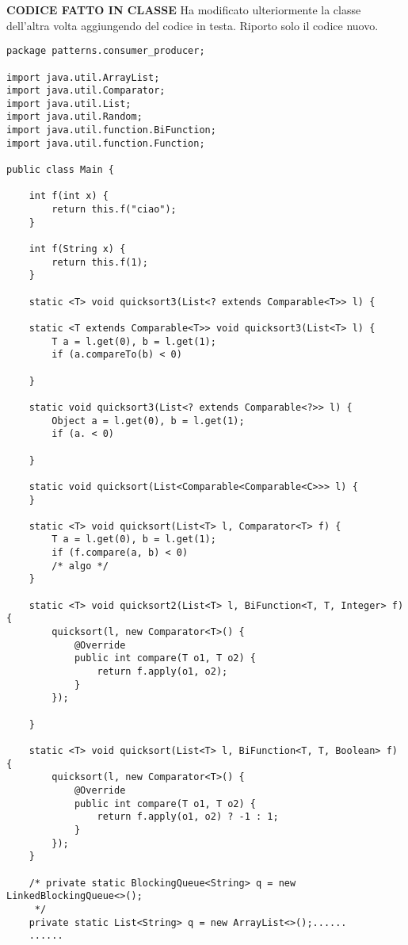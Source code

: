 \noindent \textbf{CODICE FATTO IN CLASSE} \newline
\noindent Ha modificato ulteriormente la classe dell'altra volta aggiungendo del codice in testa. Riporto solo il codice nuovo.
\begin{lstlisting}
package patterns.consumer_producer;

import java.util.ArrayList;
import java.util.Comparator;
import java.util.List;
import java.util.Random;
import java.util.function.BiFunction;
import java.util.function.Function;

public class Main {

    int f(int x) {
        return this.f("ciao");
    }

    int f(String x) {
        return this.f(1);
    }

    static <T> void quicksort3(List<? extends Comparable<T>> l) {

    static <T extends Comparable<T>> void quicksort3(List<T> l) {
        T a = l.get(0), b = l.get(1);
        if (a.compareTo(b) < 0)

    }

    static void quicksort3(List<? extends Comparable<?>> l) {
        Object a = l.get(0), b = l.get(1);
        if (a. < 0)

    }

    static void quicksort(List<Comparable<Comparable<C>>> l) {
    }

    static <T> void quicksort(List<T> l, Comparator<T> f) {
        T a = l.get(0), b = l.get(1);
        if (f.compare(a, b) < 0)
        /* algo */
    }

    static <T> void quicksort2(List<T> l, BiFunction<T, T, Integer> f) {
        quicksort(l, new Comparator<T>() {
            @Override
            public int compare(T o1, T o2) {
                return f.apply(o1, o2);
            }
        });

    }

    static <T> void quicksort(List<T> l, BiFunction<T, T, Boolean> f) {
        quicksort(l, new Comparator<T>() {
            @Override
            public int compare(T o1, T o2) {
                return f.apply(o1, o2) ? -1 : 1;
            }
        });
    }

    /* private static BlockingQueue<String> q = new LinkedBlockingQueue<>();
     */
    private static List<String> q = new ArrayList<>();......
    ......    
\end{lstlisting}